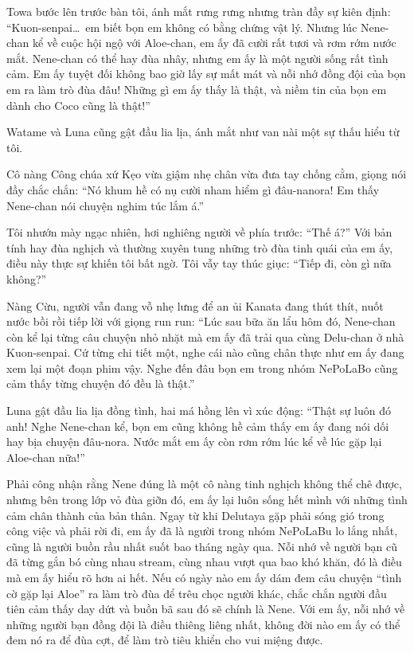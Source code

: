 \documentclass[../main.tex]{subfiles}
\begin{document}
Towa bước lên trước bàn tôi, ánh mắt rưng rưng nhưng tràn đầy sự kiên định: ``Kuon-senpai\dots\ em biết bọn em không có bằng chứng vật lý. Nhưng lúc Nene-chan kể về cuộc hội ngộ với Aloe-chan, em ấy đã cười rất tươi và rơm rớm nước mắt. Nene-chan có thể hay đùa nhây, nhưng em ấy là một người sống rất tình cảm. Em ấy tuyệt đối không bao giờ lấy sự mất mát và nỗi nhớ đồng đội của bọn em ra làm trò đùa đâu! Những gì em ấy thấy là thật, và niềm tin của bọn em dành cho Coco cũng là thật!''

Watame và Luna cũng gật đầu lia lịa, ánh mắt như van nài một sự thấu hiểu từ tôi.

Cô nàng Công chúa xứ Kẹo vừa giậm nhẹ chân vừa đưa tay chống cằm, giọng nói đầy chắc chắn: ``Nó khum hề có nụ cười nham hiểm gì đâu-nanora! Em thấy Nene-chan nói chuyện nghim túc lắm á.''

Tôi nhướn mày ngạc nhiên, hơi nghiêng người về phía trước: ``Thế á?'' Với bản tính hay đùa nghịch và thường xuyên tung những trò đùa tinh quái của em ấy, điều này thực sự khiến tôi bất ngờ. Tôi vẫy tay thúc giục: ``Tiếp đi, còn gì nữa không?''

Nàng Cừu, người vẫn đang vỗ nhẹ lưng để an ủi Kanata đang thút thít, nuốt nước bồi rồi tiếp lời với giọng run run: ``Lúc sau bữa ăn lẩu hôm đó, Nene-chan còn kể lại từng câu chuyện nhỏ nhặt mà em ấy đã trải qua cùng Delu-chan ở nhà Kuon-senpai. Cứ từng chi tiết một, nghe cái nào cũng chân thực như em ấy đang xem lại một đoạn phim vậy. Nghe đến đâu bọn em trong nhóm NePoLaBo cũng cảm thấy từng chuyện đó đều là thật.''

Luna gật đầu lia lịa đồng tình, hai má hồng lên vì xúc động: ``Thật sự luôn đó anh! Nghe Nene-chan kể, bọn em cũng không hề cảm thấy em ấy đang nói dối hay bịa chuyện đâu-nora. Nước mắt em ấy còn rơm rớm lúc kể về lúc gặp lại Aloe-chan nữa!''

Phải công nhận rằng Nene đúng là một cô nàng tinh nghịch không thể chê được, nhưng bên trong lớp vỏ đùa giỡn đó, em ấy lại luôn sống hết mình với những tình cảm chân thành của bản thân. Ngay từ khi Delutaya gặp phải sóng gió trong công việc và phải rời đi, em ấy đã là người trong nhóm NePoLaBu lo lắng nhất, cũng là người buồn rầu nhất suốt bao tháng ngày qua. Nỗi nhớ về người bạn cũ đã từng gắn bó cùng nhau stream, cùng nhau vượt qua bao khó khăn, đó là điều mà em ấy hiểu rõ hơn ai hết. Nếu có ngày nào em ấy dám đem câu chuyện ``tình cờ gặp lại Aloe'' ra làm trò đùa để trêu chọc người khác, chắc chắn người đầu tiên cảm thấy day dứt và buồn bã sau đó sẽ chính là Nene. Với em ấy, nỗi nhớ về những người bạn đồng đội là điều thiêng liêng nhất, không đời nào em ấy có thể đem nó ra để đùa cợt, để làm trò tiêu khiển cho vui miệng được.
\end{document}
